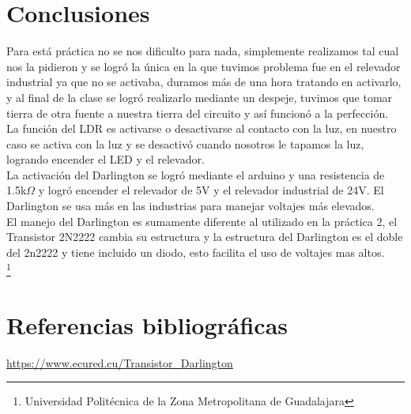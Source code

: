 \documentclass[10pt,a4paper]{article}
\begin{document}
\section{Conclusiones}
Para está práctica no se nos dificulto para nada, simplemente realizamos tal cual nos la pidieron y se logró la única en la que tuvimos problema fue en el relevador industrial ya que no se activaba, duramos más de una hora tratando en activarlo, y al final de la clase se logró realizarlo mediante un despeje, tuvimos que tomar tierra de otra fuente a nuestra tierra del circuito y así funcionó a la perfección. \\

La función del LDR es activarse o desactivarse al contacto con la luz, en nuestro caso se activa con la luz y se desactivó cuando nosotros le tapamos la luz, logrando encender el LED y el relevador.\\

La activación del Darlington se logró mediante el arduino y una resistencia de 1.5k$\Omega$ y logró encender el relevador de 5V y el relevador industrial de 24V. El Darlington se usa más en las industrias para manejar voltajes más elevados.\\

El manejo del Darlington es sumamente diferente al utilizado en la práctica 2, el Transistor 2N2222 cambia su estructura y la estructura del Darlington es el doble del 2n2222 y tiene incluido un diodo, esto facilita el uso de voltajes mas altos.\\

\footnote{Universidad Politécnica de la Zona Metropolitana de Guadalajara}

\newpage
\section{Referencias bibliográficas}

\url{https://www.ecured.cu/Transistor_Darlington}
\end{document}
